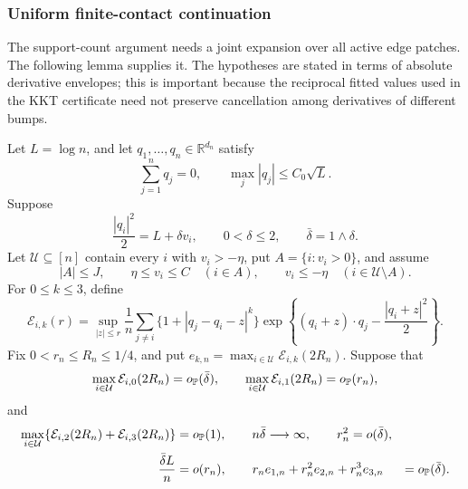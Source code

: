 \subsubsection{Uniform finite-contact continuation}

The support-count argument needs a joint expansion over all active edge
patches.  The following lemma supplies it.  The hypotheses are stated in
terms of absolute derivative envelopes; this is important because the
reciprocal fitted values used in the KKT certificate need not preserve
cancellation among derivatives of different bumps.

\begin{lemma}
\label{lem:uniform-finite-edge-expansion}
Let \(L=\log n\), and let \(q_1,\ldots,q_n\in\mathbb R^{d_n}\) satisfy
\[
 \sum_{j=1}^nq_j=0,\qquad \max_j|q_j|\le C_0\sqrt L.
\]
Suppose
\[
 \frac{|q_i|^2}{2}=L+\delta v_i,\qquad 0<\delta\le2,
 \qquad \bar\delta=1\wedge\delta.
\]
Let \(\mathcal U\subseteq[n]\) contain every \(i\) with \(v_i>-\eta\),
put \(A=\{i:v_i>0\}\), and assume
\[
 |A|\le J,\qquad \eta\le v_i\le C\quad(i\in A),\qquad
 v_i\le-\eta\quad(i\in\mathcal U\setminus A).
\]
For \(0\le k\le3\), define
\begin{equation}
\label{eq:finite-edge-derivative-envelope}
\mathcal E_{i,k}(r)
 =
 \sup_{|z|\le r}\frac1n\sum_{j\ne i}
 \{1+|q_j-q_i-z|^k\}
 \exp\left\{(q_i+z)\cdot q_j-\frac{|q_i+z|^2}{2}\right\}.
\end{equation}
Fix \(0<r_n\le R_n\le1/4\), and put
\(e_{k,n}=\max_{i\in\mathcal U}\mathcal E_{i,k}(2R_n)\).  Suppose that
\begin{equation}
\label{eq:finite-edge-envelope-assumptions}
 \max_{i\in\mathcal U}\mathcal E_{i,0}(2R_n)
   =o_{\mathbb P}(\bar\delta),\qquad
 \max_{i\in\mathcal U}\mathcal E_{i,1}(2R_n)
   =o_{\mathbb P}(r_n),
\end{equation}
and
\begin{equation}
\label{eq:finite-edge-higher-envelope-assumptions}
 \begin{aligned}
 \max_{i\in\mathcal U}
 \{\mathcal E_{i,2}(2R_n)+\mathcal E_{i,3}(2R_n)\}
 &=o_{\mathbb P}(1),\qquad
 n\bar\delta\longrightarrow\infty,
 \qquad
 r_n^2=o(\bar\delta),\\
 \frac{\bar\delta L}{n}&=o(r_n),\qquad
 r_ne_{1,n}+r_n^2e_{2,n}+r_n^3e_{3,n}
 &=o_{\mathbb P}(\bar\delta).
 \end{aligned}
\end{equation}


\end{lemma}
